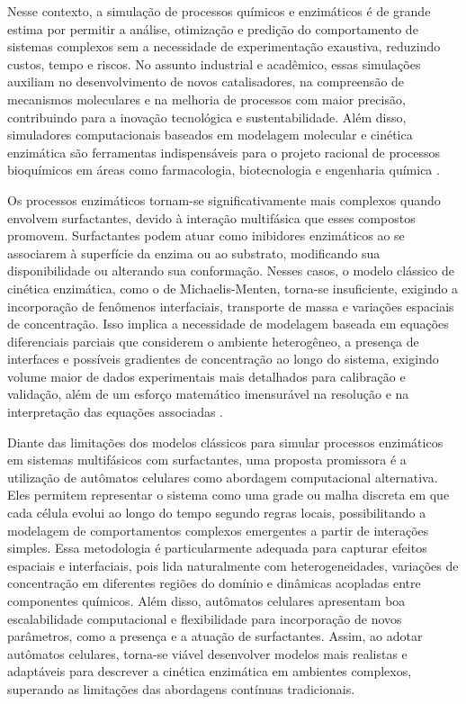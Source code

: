 \documentclass[12pt,oneside]{report}
\begin{document}
Nesse contexto, a simulação de processos químicos e enzimáticos é de grande estima por permitir a análise, otimização e predição do comportamento de sistemas complexos sem a necessidade de experimentação exaustiva, reduzindo custos, tempo e riscos. No assunto industrial e acadêmico, essas simulações auxiliam no desenvolvimento de novos catalisadores, na compreensão de mecanismos moleculares e na melhoria de processos com maior precisão, contribuindo para a inovação tecnológica e sustentabilidade. Além disso, simuladores computacionais baseados em modelagem molecular e cinética enzimática são ferramentas indispensáveis para o projeto racional de processos bioquímicos em áreas como farmacologia, biotecnologia e engenharia química \cite{leach2001}.

Os processos enzimáticos tornam-se significativamente mais complexos quando envolvem surfactantes, devido à interação multifásica que esses compostos promovem. Surfactantes podem atuar como inibidores enzimáticos ao se associarem à superfície da enzima ou ao substrato, modificando sua disponibilidade ou alterando sua conformação. Nesses casos, o modelo clássico de cinética enzimática, como o de Michaelis-Menten, torna-se insuficiente, exigindo a incorporação de fenômenos interfaciais, transporte de massa e variações espaciais de concentração. Isso implica a necessidade de modelagem baseada em equações diferenciais parciais que considerem o ambiente heterogêneo, a presença de interfaces e possíveis gradientes de concentração ao longo do sistema, exigindo volume maior de dados experimentais mais detalhados para calibração e validação, além de um esforço matemático imensurável na resolução e na interpretação das equações associadas \cite{vandermeer2001}.

Diante das limitações dos modelos clássicos para simular processos enzimáticos em sistemas multifásicos com surfactantes, uma proposta promissora é a utilização de autômatos celulares como abordagem computacional alternativa. Eles permitem representar o sistema como uma grade ou malha discreta em que cada célula evolui ao longo do tempo segundo regras locais, possibilitando a modelagem de comportamentos complexos emergentes a partir de interações simples. Essa metodologia é particularmente adequada para capturar efeitos espaciais e interfaciais, pois lida naturalmente com heterogeneidades, variações de concentração em diferentes regiões do domínio e dinâmicas acopladas entre componentes químicos. Além disso, autômatos celulares apresentam boa escalabilidade computacional e flexibilidade para incorporação de novos parâmetros, como a presença e a atuação de surfactantes. Assim, ao adotar autômatos celulares, torna-se viável desenvolver modelos mais realistas e adaptáveis para descrever a cinética enzimática em ambientes complexos, superando as limitações das abordagens contínuas tradicionais.
\end{document}
